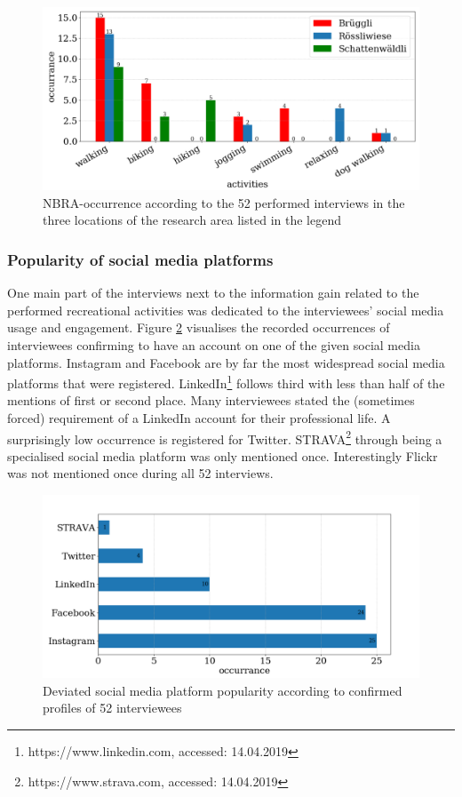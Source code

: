 \begin{figure}[!htb]
   \centering
   \includegraphics[width=\textwidth]{img/interview_activities.pdf}
   \caption{NBRA-occurrence according to the 52 performed interviews in the three locations of the research area listed in the legend}
   \label{fig:interview_activities}
\end{figure}

\subsubsection{Popularity of social media platforms}
One main part of the interviews next to the information gain related to the performed recreational activities was dedicated to the interviewees' social media usage and engagement. Figure \ref{fig:interview_SMP} visualises the recorded occurrences of interviewees confirming to have an account on one of the given social media platforms. Instagram and Facebook are by far the most widespread social media platforms that were registered. LinkedIn\footnote{https://www.linkedin.com, accessed: 14.04.2019} follows third with less than half of the mentions of first or second place. Many interviewees stated the (sometimes forced) requirement of a LinkedIn account for their professional life. A surprisingly low occurrence is registered for Twitter. STRAVA\footnote{https://www.strava.com, accessed: 14.04.2019} through being a specialised social media platform was only mentioned once. Interestingly Flickr was not mentioned once during all 52 interviews.

\begin{figure}[!htb]
   \centering
   \includegraphics[width=\textwidth]{img/interview_socialmedia_bigger_font.pdf}
   \caption{Deviated social media platform popularity according to confirmed profiles of 52 interviewees}
   \label{fig:interview_SMP}
\end{figure}

